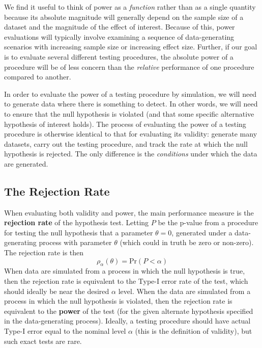 \documentclass[
]{book}
\newcommand{\Prob}{\text{Pr}}
\begin{document}
We find it useful to think of power as a \emph{function} rather than as a single quantity because its absolute magnitude will generally depend on the sample size of a dataset and the magnitude of the effect of interest.
Because of this, power evaluations will typically involve examining a sequence of data-generating scenarios with increasing sample size or increasing effect size.
Further, if our goal is to evaluate several different testing procedures, the absolute power of a procedure will be of less concern than the \emph{relative} performance of one procedure compared to another.

In order to evaluate the power of a testing procedure by simulation, we will need to generate data where there is something to detect.
In other words, we will need to ensure that the null hypothesis is violated (and that some specific alternative hypothesis of interest holds).
The process of evaluating the power of a testing procedure is otherwise identical to that for evaluating its validity: generate many datasets, carry out the testing procedure, and track the rate at which the null hypothesis is rejected.
The only difference is the \emph{conditions} under which the data are generated.

\subsection{The Rejection Rate}\label{the-rejection-rate}

When evaluating both validity and power, the main performance measure is the \textbf{rejection rate} of the hypothesis test. Letting \(P\) be the p-value from a procedure for testing the null hypothesis that a parameter \(\theta = 0\), generated under a data-generating process with parameter \(\theta\) (which could in truth be zero or non-zero). The rejection rate is then
\[
\rho_\alpha(\theta) = \Prob(P < \alpha)
\label{eq:rejection-rate}
\]
When data are simulated from a process in which the null hypothesis is true, then the rejection rate is equivalent to the Type-I error rate of the test, which should ideally be near the desired \(\alpha\) level.
When the data are simulated from a process in which the null hypothesis is violated, then the rejection rate is equivalent to the \textbf{power} of the test (for the given alternate hypothesis specified in the data-generating process).
Ideally, a testing procedure should have actual Type-I error equal to the nominal level \(\alpha\) (this is the definition of validity), but such exact tests are rare.
\end{document}
